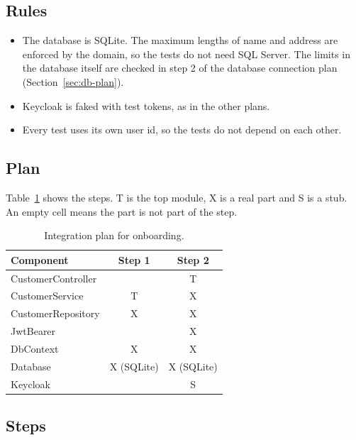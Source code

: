 \documentclass[a4paper,11pt]{article}
\begin{document}
\subsection{Rules}
\begin{itemize}
  \item The database is SQLite. The maximum lengths of name and address are enforced by the domain, so the tests do not need SQL Server. The limits in the database itself are checked in step 2 of the database connection plan (Section~\ref{sec:db-plan}).
  \item Keycloak is faked with test tokens, as in the other plans.
  \item Every test uses its own user id, so the tests do not depend on each other.
\end{itemize}


\subsection{Plan}
Table~\ref{tab:onboarding-integration-plan} shows the steps. T is the top module, X is a real part and S is a stub. An empty cell means the part is not part of the step.

\begin{table}[H]
\centering
\small
{}
\begin{tabular}{@{}l c c@{}}
\textbf{Component} & \textbf{Step 1} & \textbf{Step 2} \\
\hline
CustomerController     &   & T \\
CustomerService    & T & X \\
CustomerRepository & X & X \\
JwtBearer          &   & X \\
DbContext          & X & X \\
Database           & X (SQLite) & X (SQLite) \\
Keycloak           &   & S \\
\end{tabular}
\caption{Integration plan for onboarding.}
\label{tab:onboarding-integration-plan}
\end{table}

\subsection{Steps}
\end{document}
